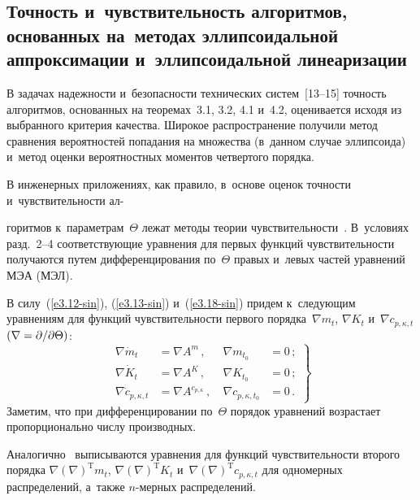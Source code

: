 \begin{multicols}{2}
\section{Точность и~чувствительность алгоритмов, основанных 
на~методах эллипсоидальной аппроксимации и~эллипсоидальной
линеаризации}

В задачах надежности и~безопасности технических систем~[13--15]
точность алгоритмов, основанных на теоремах~3.1, 3.2, 4.1 и~4.2,
оценивается исходя из выбранного критерия качества. Широ\-кое
распространение получили метод сравнения вероятностей попадания на
множества (в~данном случае эллипсоида) и~метод оценки вероятностных
моментов четвертого порядка.

В инженерных приложениях, как правило, в~основе оценок точности и~чувствительности 
ал-\linebreak\vspace*{-12pt}

\pagebreak

\noindent
горитмов к~параметрам~$\Theta$ лежат методы теории чувствительности~\cite{14-sin, 15-sin}. 
В~условиях разд.~2--4 соответствующие уравнения для первых функций чувствительности 
получаются путем дифференцирования по~$\Theta$ правых и~левых частей уравнений МЭА 
(МЭЛ).

В силу~(\ref{e3.12-sin}), (\ref{e3.13-sin}) и~(\ref{e3.18-sin}) 
придем к~следующим уравнениям для функций чувствительности 
первого порядка~$\nabla m_t$, $\nabla K_t$ и~$\nabla c_{p, \kappa,t}$ 
$(\nabla\hm= \prt/\prt\Theta)$:
    \begin{equation}
    \left.
    \begin{array}{rlrl}
    \nabla \dot m_t &= \nabla A^m\,, &\  \nabla m_{t_0} &=0\,; %
    \\[6pt]
\nabla \dot K_t &= \nabla A^K\,, &\  \nabla K_{t_0} &=0\,; %
\\[6pt]
\nabla \dot c_{p,\kappa, t}& = \nabla A^{c_{p,\kappa}}\,, &\ 
\nabla c_{p,\kappa,t_0} &=0\,.
\end{array}
\right\}
\label{e5.3-sin}
\end{equation}
Заметим, что при дифференцировании по~$\Theta$ порядок уравнений
возрастает пропорционально числу производных.

Аналогично~\cite{9-sin, 10-sin} выписываются уравнения для функций чувствительности 
второго порядка $\nabla(\nabla)^{\mathrm{T}} m_t$, 
$\nabla(\nabla)^{\mathrm{T}} K_t$ и~$\nabla(\nabla)^{\mathrm{T}} c_{p,\kappa,t}$ 
для одномерных распределений, а~также  $n$-мер\-ных распределений.


\end{multicols}
